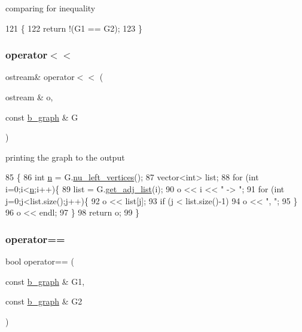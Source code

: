 comparing for inequality 


\begin{DoxyCode}
121 \{
122   \textcolor{keywordflow}{return} !(G1 == G2);
123 \}
\end{DoxyCode}
\mbox{\label{classb__graph_a0635d59bf5b2d1df3d3dd2beef14ac6e}} 
\subsubsection{\texorpdfstring{operator$<$$<$}{operator<<}}
{\footnotesize\ttfamily ostream\& operator$<$$<$ (\begin{DoxyParamCaption}\item[{ostream \&}]{o,  }\item[{const \hyperlink{classb__graph}{b\+\_\+graph} \&}]{G }\end{DoxyParamCaption})\hspace{0.3cm}{\ttfamily [friend]}}



printing the graph to the output 


\begin{DoxyCode}
85 \{
86   \textcolor{keywordtype}{int} \hyperlink{classb__graph_a9e211d40c1799bc9b125de472ff06642}{n} = G.\hyperlink{classb__graph_a5e71d5c97f2501b0b93c17146cf7e68e}{nu\_left\_vertices}();
87   vector<int> list;
88   \textcolor{keywordflow}{for} (\textcolor{keywordtype}{int} i=0;i<\hyperlink{classb__graph_a9e211d40c1799bc9b125de472ff06642}{n};i++)\{
89     list = G.\hyperlink{classb__graph_aa81c7179b9c6cb4986c4b41e84a85799}{get\_adj\_list}(i);
90     o << i << \textcolor{stringliteral}{" -> "};
91     \textcolor{keywordflow}{for} (\textcolor{keywordtype}{int} j=0;j<list.size();j++)\{
92       o << list[j];
93       \textcolor{keywordflow}{if} (j < list.size()-1)
94         o << \textcolor{stringliteral}{", "};
95     \}
96     o << endl;
97   \}
98   \textcolor{keywordflow}{return} o;
99 \}
\end{DoxyCode}
\mbox{\label{classb__graph_adf87735e8372a81049b347b1fdd23484}} 
\subsubsection{\texorpdfstring{operator==}{operator==}}
{\footnotesize\ttfamily bool operator== (\begin{DoxyParamCaption}\item[{const \hyperlink{classb__graph}{b\+\_\+graph} \&}]{G1,  }\item[{const \hyperlink{classb__graph}{b\+\_\+graph} \&}]{G2 }\end{DoxyParamCaption})\hspace{0.3cm}{\ttfamily [friend]}}



